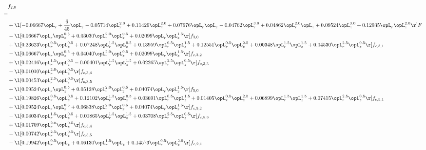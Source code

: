 \begin{alignat}{2} 
\label{eq:f_20_2} 
& f_{2,0} \nonumber \\ 
 = \\ 
& + \l[  -0.06667 \opL_r + \frac{6}{45} \opL_z   -0.05714 \opL_r^{2.0} +  0.11429 \opL_z^{2.0} +  0.07676 \opL_r \opL_z   -0.04762 \opL_r^{3.0} +  0.04862 \opL_r^{2.0} \opL_z +  0.09524 \opL_z^{3.0} +  0.12935 \opL_r \opL_z^{2.0}  \r] F \nonumber \\ 
& - \l[  0.06667 \opL_r \opL_z^{0.5} +  0.03030 \opL_r^{2.0} \opL_z^{0.5} +  0.02099 \opL_r \opL_z^{1.5}  \r] f_{3,0} \nonumber \\ 
& + \l[  0.23623 \opL_r^{0.5} \opL_z^{0.5} +  0.07248 \opL_r^{1.5} \opL_z^{0.5} +  0.13959 \opL_r^{0.5} \opL_z^{1.5} +  0.12551 \opL_r^{0.5} \opL_z^{2.5} +  0.00348 \opL_r^{1.5} \opL_z^{1.5} +  0.04530 \opL_r^{2.5} \opL_z^{0.5}  \r] f_{c,3,1} \nonumber \\ 
& - \l[  0.06667 \opL_r \opL_z^{0.5} +  0.04040 \opL_r^{2.0} \opL_z^{0.5} +  0.02099 \opL_r \opL_z^{1.5}  \r] f_{c,3,2} \nonumber \\ 
& + \l[  0.02416 \opL_r^{1.5} \opL_z^{0.5}   -0.00401 \opL_r^{1.5} \opL_z^{1.5} +  0.02265 \opL_r^{2.5} \opL_z^{0.5}  \r] f_{c,3,3} \nonumber \\ 
& - \l[  0.01010 \opL_r^{2.0} \opL_z^{0.5}  \r] f_{c,3,4} \nonumber \\ 
& + \l[  0.00453 \opL_r^{2.5} \opL_z^{0.5}  \r] f_{c,3,5} \nonumber \\ 
& + \l[  0.09524 \opL_r \opL_z^{0.5} +  0.05128 \opL_r^{2.0} \opL_z^{0.5} +  0.04074 \opL_r \opL_z^{1.5}  \r] f_{5,0} \nonumber \\ 
& - \l[  0.19826 \opL_r^{0.5} \opL_z^{0.5} +  0.12102 \opL_r^{1.5} \opL_z^{0.5} +  0.03691 \opL_r^{0.5} \opL_z^{1.5} +  0.01405 \opL_r^{0.5} \opL_z^{2.5} +  0.06899 \opL_r^{1.5} \opL_z^{1.5} +  0.07415 \opL_r^{2.5} \opL_z^{0.5}  \r] f_{c,5,1} \nonumber \\ 
& + \l[  0.09524 \opL_r \opL_z^{0.5} +  0.06838 \opL_r^{2.0} \opL_z^{0.5} +  0.04074 \opL_r \opL_z^{1.5}  \r] f_{c,5,2} \nonumber \\ 
& - \l[  0.04034 \opL_r^{1.5} \opL_z^{0.5} +  0.01865 \opL_r^{1.5} \opL_z^{1.5} +  0.03708 \opL_r^{2.5} \opL_z^{0.5}  \r] f_{c,5,3} \nonumber \\ 
& + \l[  0.01709 \opL_r^{2.0} \opL_z^{0.5}  \r] f_{c,5,4} \nonumber \\ 
& - \l[  0.00742 \opL_r^{2.5} \opL_z^{0.5}  \r] f_{c,5,5} \nonumber \\ 
& - \l[  0.19942 \opL_r^{0.5} \opL_z +  0.06130 \opL_r^{1.5} \opL_z +  0.14573 \opL_r^{0.5} \opL_z^{2.0}  \r] f_{c,2,1} \nonumber \\ 

\end{alignat}
